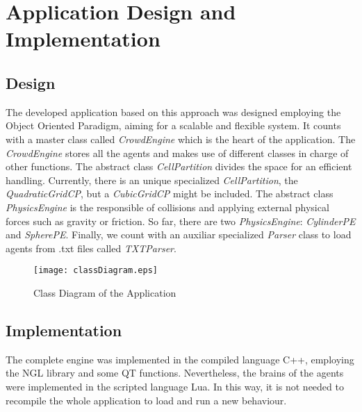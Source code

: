 \ifx\isEmbedded\undefined

\graphicspath{{../img/}}

\fi

\chapter{Application Design and Implementation}
\label{chap:application_design_implementation}

\section{Design}

The developed application based on this approach was designed employing the Object Oriented Paradigm, aiming for a scalable and flexible system. It counts with a master class called \emph{CrowdEngine} which is the heart of the application. The \emph{CrowdEngine} stores all the agents and makes use of different classes in charge of other functions. The abstract class \emph{CellPartition} divides the space for an efficient handling. Currently, there is an unique specialized \emph{CellPartition}, the \emph{QuadraticGridCP}, but a \emph{CubicGridCP} might be included. The abstract class \emph{PhysicsEngine} is the responsible of collisions and applying external physical forces such as gravity or friction. So far, there are two \emph{PhysicsEngine}: \emph{CylinderPE} and \emph{SpherePE}. Finally, we count with an auxiliar specialized \emph{Parser} class to load agents from .txt files called \emph{TXTParser}.

\begin{landscape}

\begin{figure}[!htb]
  \centering
  \texttt{[image: classDiagram.eps]}
  \caption{Class Diagram of the Application}
  \label{fig:classDiag}
\end{figure}

\end{landscape}

\section{Implementation}
The complete engine was implemented in the compiled language C++, employing the NGL library and some QT functions. Nevertheless, the brains of the agents were implemented in the scripted language Lua. In this way, it is not needed to recompile the whole application to load and run a new behaviour.

